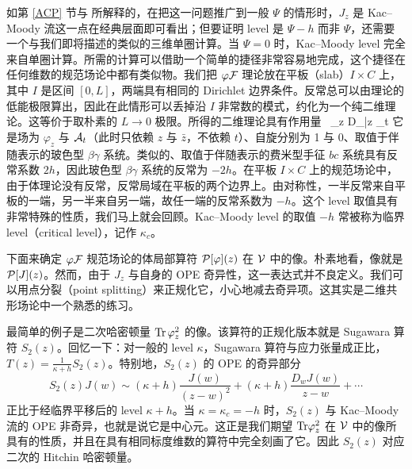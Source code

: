 如第 \ref{ACP} 节与 \cite{Gaiotto:2017euk} 所解释的，在把这一问题推广到一般 $\Psi$ 的情形时，$J_z$ 是 Kac–Moody 流这一点在经典层面即可看出；但要证明 level 是 $\Psi-h$ 而非 $\Psi$，还需要一个与我们即将描述的类似的三维单圈计算。当 $\Psi=0$ 时，Kac–Moody level 完全来自单圈计算。所需的计算可以借助一个简单的捷径非常容易地完成，这个捷径在任何维数的规范场论中都有类似物。我们把 $\varphi{\mathcal F}$ 理论放在平板（slab）$I\times C$ 上，其中 $I$ 是区间 $[0,L]$，两端具有相同的 Dirichlet 边界条件。反常总可以由理论的低能极限算出，因此在此情形可以丢掉沿 $I$ 非常数的模式，约化为一个纯二维理论。这等价于取朴素的 $L\to 0$ 极限。所得的二维理论具有作用量
\be\label{belaction}
\int \Tr \, \varphi_z D_{\bar z} \cA_t\ee
它是场为 $\varphi_z$ 与 ${\mathcal A}_t$（此时只依赖 $z$ 与 $\bar z$，不依赖 $t$）、自旋分别为 1 与 0、取值于伴随表示的玻色型 $\beta \gamma$ 系统。类似的、取值于伴随表示的费米型手征 $bc$ 系统具有反常系数 $2h$，因此玻色型 $\beta\gamma$ 系统的反常为 $-2h$。在平板 $I\times C$ 上的规范场论中，由于体理论没有反常，反常局域在平板的两个边界上。由对称性，一半反常来自平板的一端，另一半来自另一端，故任一端的反常系数为 $-h$。这个 level 取值具有非常特殊的性质，我们马上就会回顾。Kac–Moody level 的取值 $-h$ 常被称为临界 level（critical level），记作 $\kappa_c$。

下面来确定 $\varphi{\mathcal F}$ 规范场论的体局部算符 ${\cal P}[\varphi](z)$ 在 ${\cal V}$ 中的像。朴素地看，像就是 ${\cal P}[J](z)$。然而，由于 $J_z$ 与自身的 OPE 奇异性，这一表达式并不良定义。我们可以用点分裂（point splitting）来正规化它，小心地减去奇异项。这其实是二维共形场论中一个熟悉的练习。

最简单的例子是二次哈密顿量 ${\rm Tr}\, \varphi_z^2$ 的像。该算符的正规化版本就是 Sugawara 算符 $S_2(z)$。回忆一下：对一般的 level $\kappa$，Sugawara 算符与应力张量成正比，$T(z) = \frac{1}{\kappa + h} S_2(z)$。特别地，$S_2(z)$ 的 OPE 的奇异部分
\begin{equation}
S_2(z) J(w) \sim (\kappa + h)\frac{J(w)}{(z-w)^2} + (\kappa + h) \frac{D_w J(w)}{z-w} + \cdots
\end{equation}
正比于经临界平移后的 level $\kappa+h$。当 $\kappa=\kappa_c=-h$ 时，$S_2(z)$ 与 Kac–Moody 流的 OPE 非奇异，也就是说它是中心元。这正是我们期望 ${\rm Tr} \varphi_z^2$ 在 ${\cal V}$ 中的像所具有的性质，并且在具有相同标度维数的算符中完全刻画了它。因此 $S_2(z)$ 对应二次的 Hitchin 哈密顿量。

